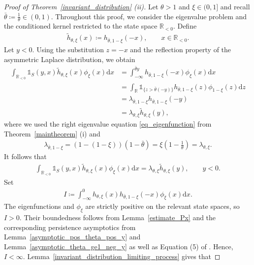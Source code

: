 \documentclass[10pt,a4paper]{amsart}
\newcommand{\R}{\mathbb{R}} %
\newcommand{\1}{\mathds{1}}
\renewcommand{\d}{\mathrm{d}}
\begin{document}
\begin{proof}[Proof of Theorem~\ref{invariant_distribution} (ii)]
Let $\theta>1$ and $\xi\in(0,1]$ and recall $
\bar\theta \coloneqq \frac{1}{\theta}\in(0,1)$.
Throughout this proof, we consider the eigenvalue problem and the
conditioned kernel restricted to the state space $\R_{<0}$. Define 
\begin{align*} 
    \tilde h_{\theta,\xi}(x) \coloneqq h_{\bar\theta,1-\xi}(-x), \qquad x\in\R_{<0}. 
\end{align*} 
Let $y<0$. Using the substitution $z=-x$ and the reflection property of the asymmetric Laplace distribution, we obtain
\begin{align*} 
    \int_{\R_{<0}} \mathds{1}_S(y,x) \tilde h_{\theta,\xi}(x) \phi_\xi( x)\d x 
     &= \int_{-\infty}^{\bar\theta y} h_{\bar\theta,1-\xi}(-x) \phi_\xi( x)\d x 
    \\ &= \int_\R \mathds{1}_{\{z>\bar\theta(-y)\}} h_{\bar\theta,1-\xi}(z) \phi_{1-\xi}( z)\d z 
    \\ &= \lambda_{\bar\theta,1-\xi} h_{\bar\theta,1-\xi}(-y)
        \\ &= \lambda_{\theta,\xi} \tilde h_{\theta,\xi}(y),
\end{align*} 
where we used the right eigenvalue equation \eqref{eq_eigenfunction} from Theorem~\ref{maintheorem} (i) and
\begin{align*} 
    \lambda_{\bar\theta,1-\xi}
    = (1-(1-\xi))(1-\bar\theta) 
    = \xi\left(1-\frac{1}{\theta}\right) 
    = \lambda_{\theta,\xi}. 
\end{align*} 
It follows that 
\begin{align*} 
    \int_{\R_{<0}} \mathds{1}_S(y,x) \tilde h_{\theta,\xi}(x) \phi_\xi( x)\d x = \lambda_{\theta,\xi} \tilde h_{\theta,\xi}(y), \qquad y<0. 
\end{align*}
Set 
\begin{align*} 
    I\coloneqq \int_{-\infty}^0 h_{\theta,\xi}(x) h_{\bar\theta,1-\xi}(-x) \phi_\xi( x)\d x.
\end{align*} 
The eigenfunctions and $\phi_\xi$ are strictly positive on the relevant state spaces, so $I >0$. Their boundedness follows from Lemma~\ref{estimate_Px} and the corresponding persistence asymptotics from Lemma~\ref{asymptotic_pos_theta_pos_y} and Lemma~\ref{asymptotic_theta_ge1_neg_y} as well as Equation (5) of \cite{AR}. Hence, $I <\infty$.
Lemma~\ref{invariant_distribution_limiting_process} gives that

\end{proof}
\end{document}
